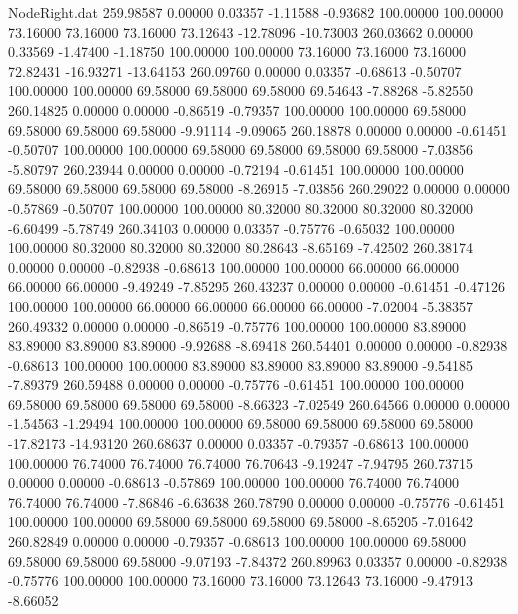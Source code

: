 \begin{filecontents}{NodeRight.dat}
 259.98587    0.00000    0.03357    -1.11588   -0.93682  100.00000  100.00000   73.16000   73.16000   73.16000   73.12643  -12.78096  -10.73003
 260.03662    0.00000    0.33569    -1.47400   -1.18750  100.00000  100.00000   73.16000   73.16000   73.16000   72.82431  -16.93271  -13.64153
 260.09760    0.00000    0.03357    -0.68613   -0.50707  100.00000  100.00000   69.58000   69.58000   69.58000   69.54643   -7.88268   -5.82550
 260.14825    0.00000    0.00000    -0.86519   -0.79357  100.00000  100.00000   69.58000   69.58000   69.58000   69.58000   -9.91114   -9.09065
 260.18878    0.00000    0.00000    -0.61451   -0.50707  100.00000  100.00000   69.58000   69.58000   69.58000   69.58000   -7.03856   -5.80797
 260.23944    0.00000    0.00000    -0.72194   -0.61451  100.00000  100.00000   69.58000   69.58000   69.58000   69.58000   -8.26915   -7.03856
 260.29022    0.00000    0.00000    -0.57869   -0.50707  100.00000  100.00000   80.32000   80.32000   80.32000   80.32000   -6.60499   -5.78749
 260.34103    0.00000    0.03357    -0.75776   -0.65032  100.00000  100.00000   80.32000   80.32000   80.32000   80.28643   -8.65169   -7.42502
 260.38174    0.00000    0.00000    -0.82938   -0.68613  100.00000  100.00000   66.00000   66.00000   66.00000   66.00000   -9.49249   -7.85295
 260.43237    0.00000    0.00000    -0.61451   -0.47126  100.00000  100.00000   66.00000   66.00000   66.00000   66.00000   -7.02004   -5.38357
 260.49332    0.00000    0.00000    -0.86519   -0.75776  100.00000  100.00000   83.89000   83.89000   83.89000   83.89000   -9.92688   -8.69418
 260.54401    0.00000    0.00000    -0.82938   -0.68613  100.00000  100.00000   83.89000   83.89000   83.89000   83.89000   -9.54185   -7.89379
 260.59488    0.00000    0.00000    -0.75776   -0.61451  100.00000  100.00000   69.58000   69.58000   69.58000   69.58000   -8.66323   -7.02549
 260.64566    0.00000    0.00000    -1.54563   -1.29494  100.00000  100.00000   69.58000   69.58000   69.58000   69.58000  -17.82173  -14.93120
 260.68637    0.00000    0.03357    -0.79357   -0.68613  100.00000  100.00000   76.74000   76.74000   76.74000   76.70643   -9.19247   -7.94795
 260.73715    0.00000    0.00000    -0.68613   -0.57869  100.00000  100.00000   76.74000   76.74000   76.74000   76.74000   -7.86846   -6.63638
 260.78790    0.00000    0.00000    -0.75776   -0.61451  100.00000  100.00000   69.58000   69.58000   69.58000   69.58000   -8.65205   -7.01642
 260.82849    0.00000    0.00000    -0.79357   -0.68613  100.00000  100.00000   69.58000   69.58000   69.58000   69.58000   -9.07193   -7.84372
 260.89963    0.03357    0.00000    -0.82938   -0.75776  100.00000  100.00000   73.16000   73.16000   73.12643   73.16000   -9.47913   -8.66052

\end{filecontents}
